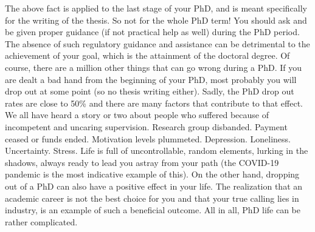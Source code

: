 \documentclass[
  12pt,
  oneside]{book}
\begin{document}
The above fact is applied to the last stage of your PhD, and is meant specifically for the writing of the thesis.
So not for the whole PhD term! You should ask and be given proper guidance (if not practical help as well) during the PhD period.
The absence of such regulatory guidance and assistance can be detrimental to the achievement of your goal, which is the attainment of the doctoral degree.
Of course, there are a million other things that can go wrong during a PhD.
If you are dealt a bad hand from the beginning of your PhD, most probably you will drop out at some point (so no thesis writing either).
Sadly, the PhD drop out rates are close to 50\% and there are many factors that contribute to that effect.
We all have heard a story or two about people who suffered because of incompetent and uncaring supervision.
Research group disbanded.
Payment ceased or funds ended.
Motivation levels plummeted.
Depression.
Loneliness.
Uncertainty.
Stress.
Life is full of uncontrollable, random elements, lurking in the shadows, always ready to lead you astray from your path (the COVID-19 pandemic is the most indicative example of this).
On the other hand, dropping out of a PhD can also have a positive effect in your life.
The realization that an academic career is not the best choice for you and that your true calling lies in industry, is an example of such a beneficial outcome.
All in all, PhD life can be rather complicated.
\end{document}
